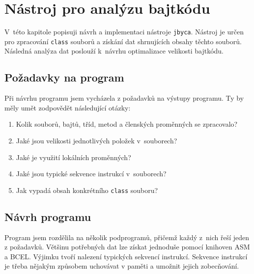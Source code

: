 \chapter{Nástroj pro analýzu bajtkódu}\label{Tool}



V~této kapitole popisuji návrh a implementaci nástroje \texttt{jbyca}. Nástroj je určen pro zpracování \texttt{class} souborů a získání dat shrnujících obsahy těchto souborů. Následná analýza dat poslouží k~návrhu optimalizace velikosti bajtkódu.

\section{Požadavky na program}\label{ToolRequirements}


Při návrhu programu jsem vycházela z požadavků na výstupy programu.
Ty by měly umět zodpovědět následující otázky: 

\begin{enumerate}
\setlength{\itemsep}{0pt}
\setlength{\parskip}{0pt}
\item Kolik souborů, bajtů, tříd, metod a členských proměnných se zpracovalo? 
\item Jaké jsou velikosti jednotlivých položek v~souborech? 
\item Jaké je využití lokálních proměnných? 
\item Jaké jsou typické sekvence instrukcí v~souborech?
\item Jak vypadá obsah konkrétního \texttt{class} souboru? 
\end{enumerate}

\section{Návrh programu}\label{ToolDesign}

Program jsem rozdělila na několik podprogramů, přičemž každý z~nich řeší jeden z požadavků. 
Většinu potřebných dat lze získat jednoduše pomocí knihoven ASM a BCEL. Výjimku tvoří nalezení typických sekvencí instrukcí. Sekvence instrukcí je třeba nějakým způsobem uchovávat v paměti a umožnit jejich zobecňování.

